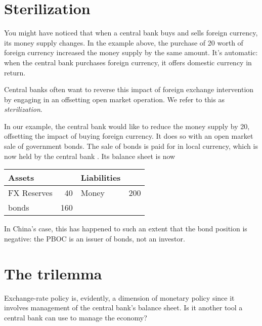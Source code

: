 \section{Sterilization   }

You might have noticed that when a central bank  buys and sells foreign currency,
its money supply changes.
In the example above, the purchase of 20 worth of foreign currency increased the money supply by the same amount.
It's automatic:  when the central bank  purchases foreign currency, it offers domestic
currency in return.

Central banks  often want to reverse this impact of foreign exchange intervention
by engaging in an offsetting open market operation.
We refer to this as {\it sterilization\/}.  

In our example, the central bank  would like to reduce the money supply by 20,
offsetting the impact of buying foreign currency.
It does so with an open market sale of government bonds. 
The sale of bonds  is paid for in local currency, which is now held
by the central bank .
Its balance sheet is now
%
\begin{center}
\begin{tabular}{lr|lr}
               Assets  &     &     Liabilities                     \\
               \hline
               FX Reserves &  40 &     Money &  200   \\
               bonds  & 160 &
\end{tabular}
\end{center}
%
In China's case, this has happened to such an extent that the bond 
position is negative:  the PBOC is an issuer of bonds, not an investor.


\section{The trilemma  }

Exchange-rate policy is, evidently, a dimension of monetary policy
since it involves management of the central bank's  balance sheet.
Is it another tool a central bank  can use to manage the economy?

